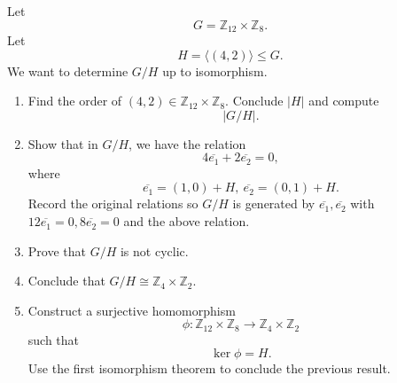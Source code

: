 \begin{prob}
    Let 
    \[
        G = \mathbb Z_{12} \times \mathbb Z_8.
    \]
    Let 
    \[
        H = \langle (4,2) \rangle \leq G.
    \]
    We want to determine $G/H$ up to isomorphism.

    \begin{enumerate}[label=\alph*)]
        \item Find the order of $(4,2) \in 
            \mathbb Z_{12} \times \mathbb Z_8$. 
            Conclude $|H|$ and compute 
            \[
                |G/H|.
            \]
        \item Show that in $G/H$, we have the relation 
            \[
                4 \overline{e_1} + 2 \overline{e_2} = 0, 
            \]
            where 
            \[
                \overline{e_1} = (1,0) + H, 
                \ \overline{e_2} = (0,1) + H.
            \]
            Record the original relations so 
            $G/H$ is generated by $\overline{e_1},\overline{e_2}$ 
            with $12\overline{e_1} = 0, 8 \overline{e_2} = 0$ and 
            the above relation.
        \item Prove that $G/H$ is not cyclic.
        \item Conclude that $G/H \cong \mathbb Z_4 \times 
            \mathbb Z_2$.
        \item Construct a surjective homomorphism 
            \[
                \phi : \mathbb Z_{12} \times 
                \mathbb Z_8 \to \mathbb Z_4 \times \mathbb Z_2 
            \]
            such that 
            \[
                \ker \phi = H.
            \]
            Use the first isomorphism theorem to conclude 
            the previous result.
    \end{enumerate}
\end{prob}

